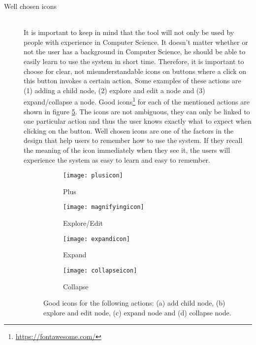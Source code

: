 \begin{description}
	\item[Well chosen icons] \hfill \\
	It is important to keep in mind that the tool will not only be used by people with experience in Computer Science. It doesn't matter whether or not the user has a background in Computer Science, he should be able to easily learn to use the system in short time. Therefore, it is important to choose for clear, not misunderstandable icons on buttons where a click on this button invokes a certain action. Some examples of these actions are (1) adding a child node, (2) explore and edit a node and (3) expand/collapse a node. Good icons\footnote{\url{https://fontawesome.com/}} for each of the mentioned actions are shown in figure \ref{fig:icons}. The icons are not ambiguous, they can only be linked to one particular action and thus the user knows exactly what to expect when clicking on the button. Well chosen icons are one of the factors in the design that help users to remember how to use the system. If they recall the meaning of the icon immediately when they see it, the users will experience the system as easy to learn and easy to remember.

\begin{figure}[H]
	\centering
	\begin{subfigure}{.2\textwidth}
  		\centering
  		\texttt{[image: plusicon]}
  		\caption{Plus}
  		\label{fig:plusicon}
	\end{subfigure}%
	\begin{subfigure}{.2\textwidth}
  		\centering
  		\texttt{[image: magnifyingicon]}
  		\caption{Explore/Edit}
  		\label{fig:editicon}
	\end{subfigure}
	\begin{subfigure}{.2\textwidth}
  		\centering
  		\texttt{[image: expandicon]}
  		\caption{Expand}
  		\label{fig:expandicon}
	\end{subfigure}
	\begin{subfigure}{.2\textwidth}
  		\centering
  		\texttt{[image: collapseicon]}
  		\caption{Collapse}
  		\label{fig:collapseicon}
	\end{subfigure}
	\caption{Good icons for the following actions: (a) add child node, (b) explore and edit node, (c) expand node and (d) collapse node.}
	\label{fig:icons}
\end{figure}
	

\end{description}
